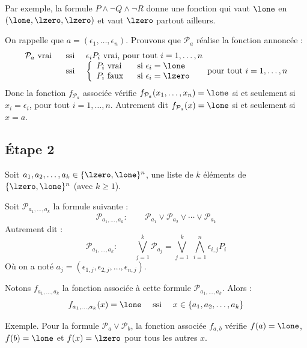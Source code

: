 \documentclass[11pt,class=report,crop=false]{standalone}
\begin{document}
Par exemple, la formule $P \land \lnot Q \land \lnot R$ donne une fonction qui vaut $\lone$ en $(\lone,\lzero,\lzero)$ et vaut $\lzero$ partout ailleurs.


On rappelle que $a = (\epsilon_1,\ldots,\epsilon_n)$.
Prouvons que $\mathcal{P}_a$ réalise la fonction annoncée :
\[
\begin{array}{rcl}
\mathcal{P}_a \text{ vrai } 
	& \text{ ssi } & \epsilon_i P_i \text{ vrai, pour tout } i=1,\ldots,n \\
	& \text{ ssi } & 
	\left\{ 
	\begin{array}{ll}
	P_i \text{ vrai } & \text{ si } \epsilon_i = \lone \\
	P_i \text{ faux } & \text{ si } \epsilon_i = \lzero \\	
	\end{array}	
	\right.
	\quad \text{  pour tout } i=1,\ldots,n \\
\end{array}
\]
Donc la fonction $f_{\mathcal{P}_a}$ associée vérifie $f_{\mathcal{P}_a}(x_1,\ldots,x_n)=\lone$ si et seulement si $x_i=\epsilon_i$, pour tout $i=1,\ldots,n$.
Autrement dit $f_{\mathcal{P}_a}(x) = \lone$ si et seulement si $x=a$.

\subsection{Étape 2}

Soit $a_1,a_2,\ldots,a_k \in \{\lzero,\lone\}^n$, une liste de $k$ éléments de $\{\lzero,\lone\}^n$ (avec $k\ge1$).

Soit $\mathcal{P}_{a_1,\ldots,a_k}$ la formule suivante :
\[
\mathcal{P}_{a_1,\ldots,a_k} : \qquad
\mathcal{P}_{a_1} \lor \mathcal{P}_{a_2} \lor \cdots \lor \mathcal{P}_{a_k}
\]
Autrement dit :
\[
\mathcal{P}_{a_1,\ldots,a_k} : \qquad
\bigvee_{j=1}^k \mathcal{P}_{a_j}
= \bigvee_{j=1}^k \ \bigwedge_{i=1}^n \epsilon_{i,j} P_i
\]
Où on a noté $a_j = (\epsilon_{1,j},\epsilon_{2,j},\ldots,\epsilon_{n,j})$.

Notons $f_{a_1,\ldots,a_k}$ la fonction associée à cette formule $\mathcal{P}_{a_1,\ldots,a_k}$.
Alors :
\[
f_{a_1,\ldots,a_k}(x) =\lone \quad \text{ ssi } \quad x \in \{ a_1,a_2,\ldots,a_k \}
\]

Exemple.
Pour la formule $\mathcal{P}_a \lor \mathcal{P}_b$, la fonction associée $f_{a,b}$ vérifie $f(a)=\lone$, $f(b)=\lone$ et $f(x) = \lzero$ pour tous les autres $x$.
\end{document}
